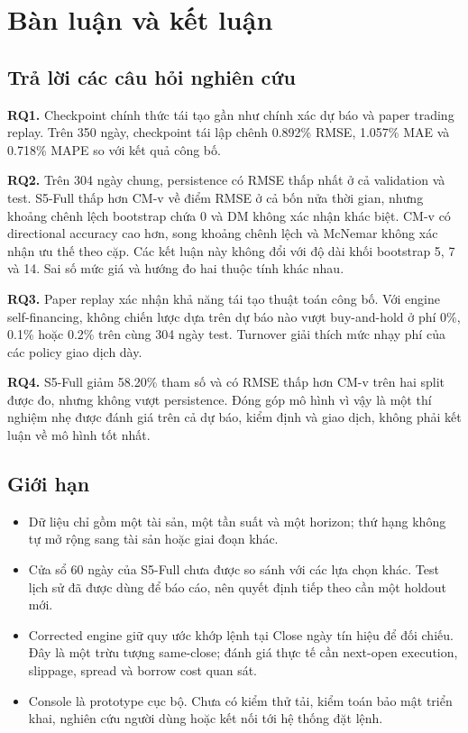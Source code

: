 \documentclass[13pt,a4paper,oneside]{report}
\begin{document}
\chapter{Bàn luận và kết luận}\label{chap:discussion}

\section{Trả lời các câu hỏi nghiên cứu}\label{sec:answers}
\textbf{RQ1.} Checkpoint chính thức tái tạo gần như chính xác dự báo và paper trading replay. Trên
350 ngày, checkpoint tái lập chênh \num{0.892}\% RMSE, \num{1.057}\% MAE và \num{0.718}\% MAPE so
với kết quả công bố.

\textbf{RQ2.} Trên 304 ngày chung, persistence có RMSE thấp nhất ở cả validation và test. S5-Full
thấp hơn CM-v về điểm RMSE ở cả bốn nửa thời gian, nhưng khoảng chênh lệch bootstrap chứa 0 và DM
không xác nhận khác biệt. CM-v có directional accuracy cao hơn, song khoảng chênh lệch và McNemar
không xác nhận ưu thế theo cặp. Các kết luận này không đổi với độ dài khối bootstrap \num{5},
\num{7} và \num{14}. Sai số mức giá và hướng đo hai thuộc tính khác nhau.

\textbf{RQ3.} Paper replay xác nhận khả năng tái tạo thuật toán công bố. Với engine self-financing,
không chiến lược dựa trên dự báo nào vượt buy-and-hold ở phí 0\%, 0.1\% hoặc 0.2\% trên cùng 304 ngày
test. Turnover giải thích mức nhạy phí của các policy giao dịch dày.

\textbf{RQ4.} S5-Full giảm \num{58.20}\% tham số và có RMSE thấp hơn CM-v trên hai split được đo,
nhưng không vượt persistence. Đóng góp mô hình vì vậy là một thí nghiệm nhẹ được đánh giá trên cả
dự báo, kiểm định và giao dịch, không phải kết luận về mô hình tốt nhất.

\section{Giới hạn}\label{sec:limitations}
\begin{itemize}
\item Dữ liệu chỉ gồm một tài sản, một tần suất và một horizon; thứ hạng không tự mở rộng sang tài
sản hoặc giai đoạn khác.
\item Cửa sổ 60 ngày của S5-Full chưa được so sánh với các lựa chọn khác. Test lịch sử đã được dùng
để báo cáo, nên quyết định tiếp theo cần một holdout mới.
\item Corrected engine giữ quy ước khớp lệnh tại Close ngày tín hiệu để đối chiếu. Đây là một trừu
tượng same-close; đánh giá thực tế cần next-open execution, slippage, spread và borrow cost quan sát.
\item Console là prototype cục bộ. Chưa có kiểm thử tải, kiểm toán bảo mật triển khai, nghiên cứu
người dùng hoặc kết nối tới hệ thống đặt lệnh.
\end{itemize}
\end{document}
